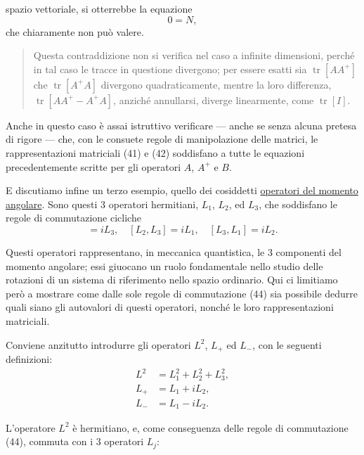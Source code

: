 \documentclass[11pt, a4paper]{book}
\numberwithin{equation}{section}
\begin{document}

spazio vettoriale, si otterrebbe la equazione
\begin{equation}
0 = N,
\end{equation}
che chiaramente non può valere.

\begin{quote}
Questa contraddizione non si verifica nel caso a infinite dimensioni,
perché in tal caso le tracce in questione divergono; per essere esatti sia
$\operatorname{tr}[AA^+]$ che $\operatorname{tr}[A^+A]$ divergono
quadraticamente, mentre la loro differenza,
$\operatorname{tr}[AA^+ - A^+A]$, anziché annullarsi, diverge
linearmente, come $\operatorname{tr}[I]$.
\end{quote}

Anche in questo caso è assai istruttivo verificare --- anche se senza
alcuna pretesa di rigore --- che, con le consuete regole di
manipolazione delle matrici, le rappresentazioni matriciali (41) e (42)
soddisfano a tutte le equazioni precedentemente scritte per gli operatori
$A$, $A^+$ e $B$.

E discutiamo infine un terzo esempio, quello dei cosiddetti
\uline{operatori del momento angolare}. Sono questi 3 operatori
hermitiani, $L_1$, $L_2$, ed $L_3$, che soddisfano le regole di
commutazione cicliche
\begin{equation}
[L_1, L_2] = iL_3, \quad [L_2, L_3] = iL_1, \quad [L_3, L_1] = iL_2.
\end{equation}

Questi operatori rappresentano, in meccanica quantistica, le 3 componenti
del momento angolare; essi giuocano un ruolo fondamentale nello studio
delle rotazioni di un sistema di riferimento nello spazio ordinario. Qui
ci limitiamo però a mostrare come dalle sole regole di commutazione (44)
sia possibile dedurre quali siano gli autovalori di questi operatori,
nonché le loro rappresentazioni matriciali.

Conviene anzitutto introdurre gli operatori $L^2$, $L_+$ ed $L_-$, con
le seguenti definizioni:
\begin{align}
L^2 &= L_1^2 + L_2^2 + L_3^2, \tag{45} \\
L_+ &= L_1 + iL_2,             \tag{46a} \\
L_- &= L_1 - iL_2.             \tag{46b}
\end{align}

L'operatore $L^2$ è hermitiano, e, come conseguenza delle regole di
commutazione (44), commuta con i 3 operatori $L_j$:
\end{document}
